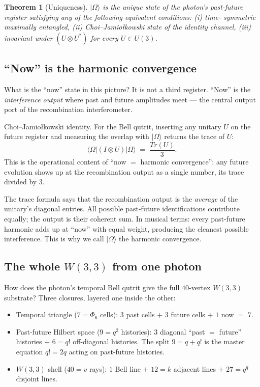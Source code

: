 \documentclass[11pt]{article}
\providecommand{\ket}[1]{|#1\rangle}
\def\mathrm#1{#1}%
\def\textbf#1{#1}%
\def\Phi#1{Phi#1}%
\newtheorem*{theorem}{Theorem}
\begin{document}
\begin{theorem}[Uniqueness]
$\ket{\Omega}$ is the \emph{unique} state of the photon's past-future
register satisfying any of the following equivalent conditions: (i) time-
symmetric maximally entangled, (ii) Choi--Jamio\l kowski state of the
identity channel, (iii) invariant under $(U \otimes U^*)$ for every
$U \in \mathrm{U}(3)$.
\end{theorem}

\subsection*{``Now'' is the harmonic convergence}

What is the ``now'' state in this picture?  It is not a third register.
``Now'' is the \emph{interference output} where past and future amplitudes
meet --- the central output port of the recombination interferometer.

\begin{mathnote}
\textbf{Choi--Jamio\l kowski identity.}  For the Bell qutrit, inserting any
unitary $U$ on the future register and measuring the overlap with $\ket{\Omega}$
returns the trace of $U$:
\[
  \langle\Omega| (I \otimes U) |\Omega\rangle \;=\; \frac{\mathrm{Tr}(U)}{3}.
\]
This is the operational content of ``now $=$ harmonic convergence'': any
future evolution shows up at the recombination output as a single number,
its trace divided by $3$.
\end{mathnote}

The trace formula says that the recombination output is the \emph{average}
of the unitary's diagonal entries.  All possible past-future identifications
contribute equally; the output is their coherent sum.  In musical terms:
every past-future harmonic adds up at ``now'' with equal weight, producing
the cleanest possible interference.  This is why we call $\ket{\Omega}$ the
harmonic convergence.

\subsection*{The whole $W(3,3)$ from one photon}

How does the photon's temporal Bell qutrit give the full $40$-vertex
$W(3,3)$ substrate?  Three closures, layered one inside the other:

\begin{itemize}[leftmargin=2em]
\item \textbf{Temporal triangle ($7 = \Phi_6$ cells):}
  $3$ past cells $+$ $3$ future cells $+$ $1$ now $=$ $7$.
\item \textbf{Past-future Hilbert space ($9 = q^2$ histories):}
  $3$ diagonal ``past $=$ future'' histories $+$ $6 = q!$ off-diagonal
  histories.  The split $9 = q + q!$ is the master equation $q! = 2q$
  acting on past-future histories.
\item \textbf{$W(3,3)$ shell ($40 = v$ rays):}
  $1$ Bell line $+$ $12 = k$ adjacent lines $+$ $27 = q^q$ disjoint lines.
\end{itemize}
\end{document}
